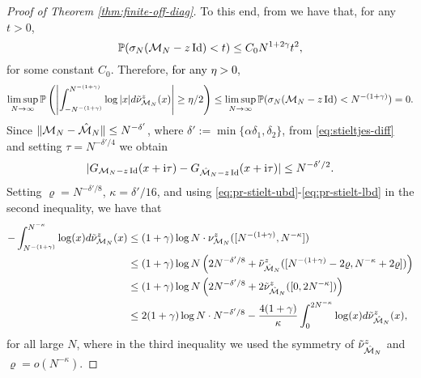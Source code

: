 \documentclass{amsart}
\numberwithin{equation}{section}
\def\corAB{}
\def\corABrev{\textcolor{black}}
\begin{document}
\begin{proof}[Proof of Theorem \ref{thm:finite-off-diag}]
To this end,
from \cite[Proposition 16]{GKZ} we have that, for any $t >0$,
\[
\mathbb P(\sigma_N(\mathcal{M}_N -z \operatorname{Id}) < t) \le C_0 N^{1+2\gamma} t^2,
\]
for some constant $C_0$. Therefore, \corABrev{for any $\eta>0$},
\begin{equation}\label{eq:log-diff-6}
\limsup_{N \to \infty} \mathbb P\left( \left|\int_{-N^{-(1+\gamma)}}^{N^{-(1+\gamma)}} \log |x| d\tilde\nu_{\mathcal{M}_N}^z(x) \right| \ge \eta/2\right) \le \limsup_{N \to \infty} \mathbb P(\sigma_N(\mathcal{M}_N - z\operatorname{Id}) < N^{-(1+\gamma)}) =0.
\end{equation}
Since $\|\mathcal{M}_N - \hat{\mathcal{M}}_N\| \le N^{-\delta'}$, where $\delta':=\min\{\alpha \delta_1,\delta_2\}$, from \eqref{eq:stieltjes-diff} and setting $\tau=N^{- \delta'/4}$ we obtain
\[
|G_{\mathcal{M}_N - z\operatorname{Id}}(x+\mathrm{i} \tau) - G_{\hat{\mathcal{M}}_N - z\operatorname{Id}}(x+\mathrm{i} \tau)| \le N^{-\delta'/2}.
\]
Setting $\varrho = N^{-\delta'/8}$, $\kappa=\delta'/16$, and using \eqref{eq:pr-stielt-ubd}-\eqref{eq:pr-stielt-lbd} in the second inequality,
we have that
\begin{align}
-\int_{N^{-(1+\gamma)}}^{N^{-\kappa}} \log (x) d\tilde\nu_{\model_N}^z(x) & \le (1+\gamma) \log N \cdot \nu_{\model_N}^z([N^{-(1+\gamma)}, N^{-\kappa}])\notag\\
 & \le (1+\gamma) \log N \left(2 N^{- \delta' /8} + \tilde \nu_{\hat
 \model_N}^z([N^{-(1+\gamma)}- 2\corAB{\varrho}, N^{-\kappa}+2\corAB{\varrho}]) \right)\notag\\
 & \le  (1+\gamma) \log N \left(2 N^{- \delta' /8} +
 2\tilde \nu_{\hat
 \model_N}^z([0, 2N^{-\kappa}]) \right) \notag\\
 & \le 2 (1+\gamma) \log N \cdot N^{-\delta' /8}-\frac{4(1+\gamma)}{\kappa} \int_0^{2N^{-\kappa}} \log (x) d\tilde
 \nu_{\hat\model_N}^z(x), \label{eq:log-near-0-1}
\end{align}
for all large $N$, where in the third inequality we used the symmetry of $\tilde \nu_{\hat {\mathcal{M}}_N}^z$
and $\varrho= o(N^{-\kappa})$.


\end{proof}
\end{document}
